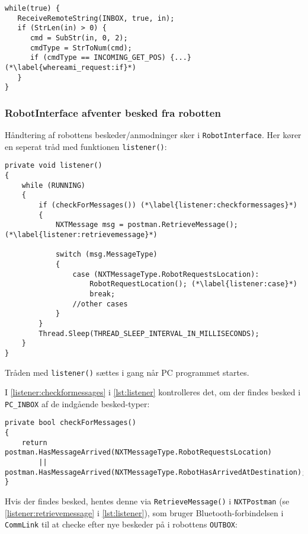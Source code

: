 \begin{lstlisting}[style=csmall,label=lst:whereami_response,caption=Robotten venter på svar.]
while(true) {
   ReceiveRemoteString(INBOX, true, in);
   if (StrLen(in) > 0) {
      cmd = SubStr(in, 0, 2);
      cmdType = StrToNum(cmd);
      if (cmdType == INCOMING_GET_POS) {...} (*\label{whereami_request:if}*)
   }
}
\end{lstlisting}

\subsubsection{RobotInterface afventer besked fra robotten}
Håndtering af robottens beskeder/anmodninger sker i \lstinline[style=csharp]!RobotInterface!.
Her kører en seperat tråd med funktionen \lstinline[style=csharp]!listener()!:
\begin{lstlisting}[style=csharpsmall,label=lst:listener,caption=listener() i RobotInterface.]
private void listener()
{
    while (RUNNING)
    {
        if (checkForMessages()) (*\label{listener:checkformessages}*)
        {
            NXTMessage msg = postman.RetrieveMessage(); (*\label{listener:retrievemessage}*)

            switch (msg.MessageType)
            {
                case (NXTMessageType.RobotRequestsLocation):
                    RobotRequestLocation(); (*\label{listener:case}*)
                    break;
                //other cases
            }
        }
        Thread.Sleep(THREAD_SLEEP_INTERVAL_IN_MILLISECONDS);
    }
}
\end{lstlisting}

Tråden med \lstinline[style=csharp]!listener()! sættes i gang når PC programmet startes.

I \cref{listener:checkformessages} i \cref{lst:listener} kontrolleres det, om der findes besked i \lstinline[style=csharp]!PC_INBOX! af de indgående besked-typer:

\begin{lstlisting}[style=csharpsmall,label=lst:checkformessages,caption=checkForMessages() i RobotInterface.]
private bool checkForMessages()
{
    return postman.HasMessageArrived(NXTMessageType.RobotRequestsLocation)
        || postman.HasMessageArrived(NXTMessageType.RobotHasArrivedAtDestination);
}
\end{lstlisting}

Hvis der findes besked, hentes denne via \lstinline[style=csharp]!RetrieveMessage()! i \lstinline[style=csharp]!NXTPostman! (se \cref{listener:retrievemessage} i \cref{lst:listener}), som bruger Bluetooth-forbindelsen i \lstinline[style=csharp]!CommLink! til at checke efter nye beskeder på i robottens \lstinline[style=c]!OUTBOX!:

